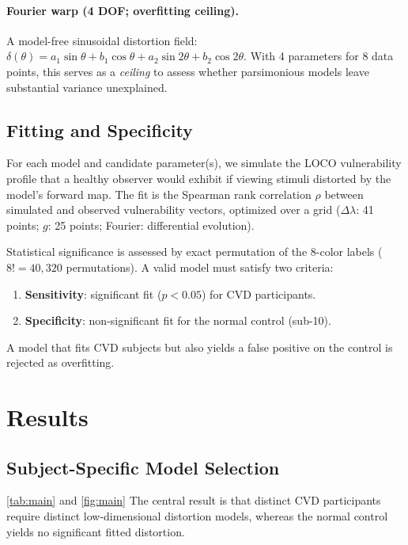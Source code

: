 \documentclass{article}
\begin{document}
\paragraph{Fourier warp (4 DOF; overfitting ceiling).}
A model-free sinusoidal distortion field: $\delta(\theta) = a_1\!\sin\theta + b_1\!\cos\theta + a_2\!\sin 2\theta + b_2\!\cos 2\theta$.
With 4 parameters for 8 data points, this serves as a \emph{ceiling} to assess whether parsimonious models leave substantial variance unexplained.

\subsection{Fitting and Specificity}

For each model and candidate parameter(s), we simulate the LOCO vulnerability profile that a healthy observer would exhibit if viewing stimuli distorted by the model's forward map.
The fit is the Spearman rank correlation $\rho$ between simulated and observed vulnerability vectors, optimized over a grid ($\Delta\lambda$: 41 points; $g$: 25 points; Fourier: differential evolution).

Statistical significance is assessed by exact permutation of the 8-color labels ($8! = 40{,}320$ permutations).
A valid model must satisfy two criteria:
\begin{enumerate}
    \item \textbf{Sensitivity}: significant fit ($p < 0.05$) for CVD participants.
    \item \textbf{Specificity}: non-significant fit for the normal control (sub-10).
\end{enumerate}
A model that fits CVD subjects but also yields a false positive on the control is rejected as overfitting.

\section{Results}
\label{sec:results}

\subsection{Subject-Specific Model Selection}

\cref{tab:main} and \cref{fig:main} The central result is that distinct CVD participants require distinct low-dimensional distortion models, whereas the normal control yields no significant fitted distortion.
\end{document}
